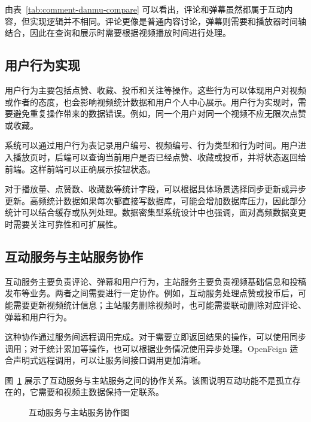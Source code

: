 由表~\ref{tab:comment-danmu-compare} 可以看出，评论和弹幕虽然都属于互动内容，但实现逻辑并不相同。评论更像是普通内容讨论，弹幕则需要和播放器时间轴结合，因此在查询和展示时需要根据视频播放时间进行处理。

\subsection{用户行为实现}
\label{subsec:user-action-implementation}

用户行为主要包括点赞、收藏、投币和关注等操作。这些行为可以体现用户对视频或作者的态度，也会影响视频统计数据和用户个人中心展示。用户行为实现时，需要避免重复操作带来的数据错误。例如，同一个用户对同一个视频不应无限次点赞或收藏。

系统可以通过用户行为表记录用户编号、视频编号、行为类型和行为时间。用户进入播放页时，后端可以查询当前用户是否已经点赞、收藏或投币，并将状态返回给前端。这样前端可以正确展示按钮状态。

对于播放量、点赞数、收藏数等统计字段，可以根据具体场景选择同步更新或异步更新。高频统计数据如果每次都直接写数据库，可能会增加数据库压力，因此部分统计可以结合缓存或队列处理。数据密集型系统设计中也强调，面对高频数据变更时需要关注可靠性和可扩展性\cite{kleppmann2017ddia}。

\subsection{互动服务与主站服务协作}
\label{subsec:interaction-web-collaboration}

互动服务主要负责评论、弹幕和用户行为，主站服务主要负责视频基础信息和投稿发布等业务。两者之间需要进行一定协作。例如，互动服务处理点赞或投币后，可能需要更新视频统计信息；主站服务删除视频时，也可能需要联动删除对应评论、弹幕和用户行为。

这种协作通过服务间远程调用完成。对于需要立即返回结果的操作，可以使用同步调用；对于统计累加等操作，也可以根据业务情况使用异步处理。OpenFeign 适合声明式远程调用，可以让服务间接口调用更加清晰\cite{springopenfeign}。

图~\ref{fig:interaction-collaboration} 展示了互动服务与主站服务之间的协作关系。该图说明互动功能不是孤立存在的，它需要和视频主数据保持一定联系。

\begin{figure}[htbp]
  \centering
  \caption{互动服务与主站服务协作图}
  \label{fig:interaction-collaboration}
\end{figure}

